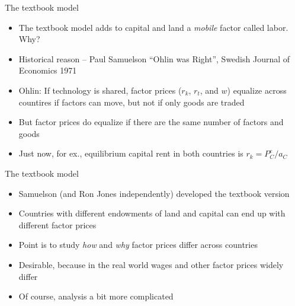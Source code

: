 \documentclass[ignorenonframetext,]{beamer}
\begin{document}
\begin{frame}{The textbook model}

    \begin{itemize}
        \item The textbook model adds to capital and land a \emph{mobile} factor called labor.  Why?
        \item Historical reason -- Paul Samuelson ``Ohlin was Right'', Swedish Journal of Economics 1971
        \item Ohlin: If technology is shared, factor prices ($r_k$, $r_t$, and $w$) equalize across countires if factors can move, but not if only goods are traded
        \item But factor prices do equalize if there are the same number of factors and goods
        \item Just now, for ex., equilibrium capital rent in both countries is $r_k = P^e_C / a_C$
    \end{itemize}

\end{frame}
    
\begin{frame}{The textbook model}

    \begin{itemize}
        \item Samuelson (and Ron Jones independently) developed the textbook version
        \item Countries with different endowments of land and capital can end up with different factor prices
        \item Point is to study \emph{how} and \emph{why} factor prices differ across countries
        \item Desirable, because in the real world wages and other factor prices widely differ
        \item Of course, analysis a bit more complicated
    \end{itemize}

\end{frame}
\end{document}
